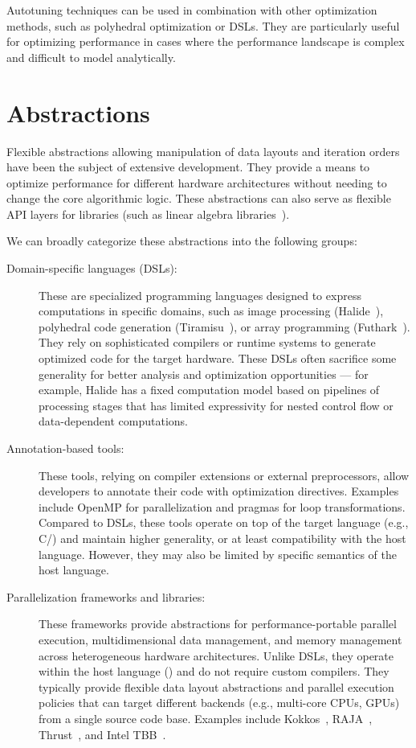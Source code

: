 Autotuning techniques can be used in combination with other optimization methods, such as polyhedral optimization or DSLs\@. They are particularly useful for optimizing performance in cases where the performance landscape is complex and difficult to model analytically.


\section{Abstractions}\label{sec:abstractions}

Flexible abstractions allowing manipulation of data layouts and iteration orders have been the subject of extensive development. They provide a means to optimize performance for different hardware architectures without needing to change the core algorithmic logic. These abstractions can also serve as flexible API layers for libraries (such as linear algebra libraries~\cite{whaley1998automatically}).

We can broadly categorize these abstractions into the following groups:

\begin{description}
  \item[Domain-specific languages (DSLs):]\label{des:dsl} These are specialized programming languages designed to express computations in specific domains, such as image processing (Halide~\cite{ragan2013halide}), polyhedral code generation (Tiramisu~\cite{baghdadi2019tiramisu}), or array programming (Futhark~\cite{henriksen2017futhark}). They rely on sophisticated compilers or runtime systems to generate optimized code for the target hardware. These DSLs often sacrifice some generality for better analysis and optimization opportunities --- for example, Halide has a fixed computation model based on pipelines of processing stages that has limited expressivity for nested control flow or data-dependent computations.
  \item[Annotation-based tools:]\label{des:annotation-based-tools} These tools, relying on compiler extensions or external preprocessors, allow developers to annotate their code with optimization directives. Examples include OpenMP for parallelization and pragmas for loop transformations. Compared to DSLs, these tools operate on top of the target language (e.g., C/\cpp) and maintain higher generality, or at least compatibility with the host language. However, they may also be limited by specific semantics of the host language.
  \item[Parallelization frameworks and libraries:]\label{des:parallelization-frameworks} These frameworks provide abstractions for performance-portable parallel execution, multidimensional data management, and memory management across heterogeneous hardware architectures. Unlike DSLs, they operate within the host language (\cpp) and do not require custom compilers. They typically provide flexible data layout abstractions and parallel execution policies that can target different backends (e.g., multi-core CPUs, GPUs) from a single source code base. Examples include Kokkos~\cite{trott2021kokkos}, RAJA~\cite{beckingsale2019raja}, Thrust~\cite{bell2011thrust}, and Intel TBB~\cite{pheatt2008intel}.
\end{description}

